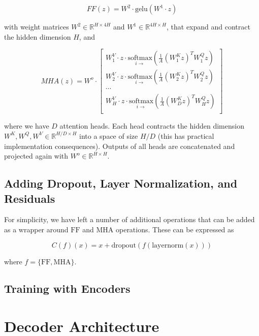 \begin{equation}
FF(z) = W^2\cdot \mathrm{gelu}(W^1 \cdot z)
\end{equation}

\noindent with weight matrices $W^2 \in \mathbb{R}^{H \times 4H}$ and $W^1 \in \mathbb{R}^{4H \times H}$, that expand and contract the hidden dimension $H$, and

\begin{equation}
MHA(z) =  W^o \cdot
\begin{bmatrix}
    W^V_1 \cdot z \cdot \underset{i \rightarrow}{\mathrm{softmax}}\left( \frac{1}{A} \left(W^K_1 z\right)^T W^Q_1 z \right)\\
    W^V_2 \cdot z \cdot \underset{i \rightarrow}{\mathrm{softmax}}\left( \frac{1}{A} \left(W^K_2 z\right)^T W^Q_2 z \right)\\
    \cdots\\
    W^V_H \cdot z \cdot \underset{i \rightarrow}{\mathrm{softmax}}\left( \frac{1}{A} \left(W^K_D z\right)^T W^Q_H z \right)\\
\end{bmatrix}\nonumber
\end{equation}

where we have $D$ attention heads. Each head contracts the hidden dimension $W^K, W^Q, W^V \in \mathbb{R}^{H / D \times H}$ into a space of size $H / D$ (this has practical implementation consequences). Outputs of all heads are concatenated and projected again with $W^o \in \mathbb{R}^{H \times H}$.

\subsection{Adding Dropout, Layer Normalization, and Residuals}

For simplicity, we have left a number of additional operations that can be added as a wrapper around $\mathrm{FF}$ and $\mathrm{MHA}$ operations. These can be expressed as

\begin{equation}
C(f)(x) = x + \mathrm{dropout}(f(\mathrm{layernorm}(x)))
\end{equation}

where $f = \{\mathrm{FF}, \mathrm{MHA}\}$.

\subsection{Training with Encoders}


\section{Decoder Architecture}

